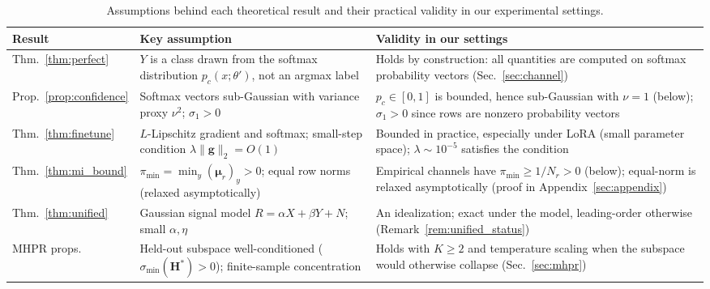 \documentclass[smallextended]{svjour3}       %
\begin{document}
\begin{table}[t]
\centering
\footnotesize
\caption{Assumptions behind each theoretical result and their practical validity in our experimental settings.}\label{tab:assumptions}
\setlength{\tabcolsep}{2pt}
\begin{tabular}{p{2.0cm} p{4.9cm} p{4.8cm}}
\toprule
Result & Key assumption & Validity in our settings \\
\midrule
Thm.~\ref{thm:perfect} & $Y$ is a class drawn from the softmax distribution $p_c(x;\theta')$, not an argmax label & Holds by construction: all quantities are computed on softmax probability vectors (Sec.~\ref{sec:channel}) \\
Prop.~\ref{prop:confidence} & Softmax vectors sub-Gaussian with variance proxy $\nu^2$; $\sigma_1>0$ & $p_c\in[0,1]$ is bounded, hence sub-Gaussian with $\nu=1$ (below); $\sigma_1>0$ since rows are nonzero probability vectors \\
Thm.~\ref{thm:finetune} & $L$-Lipschitz gradient and softmax; small-step condition $\lambda\|\mathbf{g}\|_2=O(1)$ & Bounded in practice, especially under LoRA (small parameter space); $\lambda{\sim}10^{-5}$ satisfies the condition \\
Thm.~\ref{thm:mi_bound} & $\pi_{\min}=\min_y(\boldsymbol{\mu}_r)_y>0$; equal row norms (relaxed asymptotically) & Empirical channels have $\pi_{\min}\ge 1/N_r>0$ (below); equal-norm is relaxed asymptotically (proof in Appendix~\ref{sec:appendix}) \\
Thm.~\ref{thm:unified} & Gaussian signal model $R=\alpha X+\beta Y+N$; small $\alpha,\eta$ & An idealization; exact under the model, leading-order otherwise (Remark~\ref{rem:unified_status}) \\
MHPR props. & Held-out subspace well-conditioned ($\sigma_{\min}(\mathbf{H}^*)>0$); finite-sample concentration & Holds with $K\ge2$ and temperature scaling when the subspace would otherwise collapse (Sec.~\ref{sec:mhpr}) \\
\bottomrule
\end{tabular}
\end{table}
\end{document}
